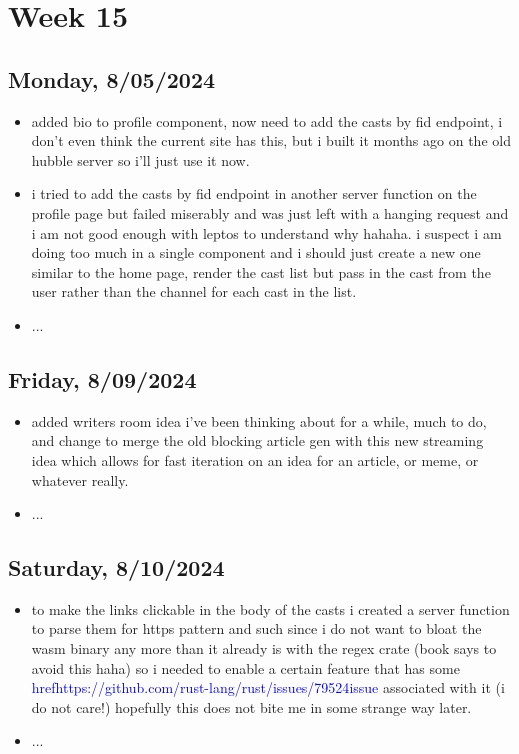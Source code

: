 \newpage
\section{Week 15}

\subsection*{Monday, 8/05/2024}
\begin{itemize}
    \item added bio to profile component, now need to add the casts by fid
        endpoint, i don't even think the current site has this, but i built it
        months ago on the old hubble server so i'll just use it now.
    \item i tried to add the casts by fid endpoint in another server function on
        the profile page but failed miserably and was just left with a hanging
        request and i am not good enough with leptos to understand why hahaha. i
        suspect i am doing too much in a single component and i should just
        create a new one similar to the home page, render the cast list but pass
        in the cast from the user rather than the channel for each cast in the
        list.
    \item ...
\end{itemize}

\subsection*{Friday, 8/09/2024}
\begin{itemize}
    \item added writers room idea i've been thinking about for a while, much to
        do, and change to merge the old blocking article gen with this new
        streaming idea which allows for fast iteration on an idea for an
        article, or meme, or whatever really.
    \item ...
\end{itemize}

\subsection*{Saturday, 8/10/2024}
\begin{itemize}
    \item to make the links clickable in the body of the casts i created a
        server function to parse them for https pattern and such since i do not
        want to bloat the wasm binary any more than it already is with the regex
        crate (book says to avoid this haha) so i needed to enable a certain
        feature that has some 
        \textcolor{blue}{href{https://github.com/rust-lang/rust/issues/79524}{issue}}
        associated with it (i do not care!)
        hopefully this does not bite me in some strange way later.
    \item ...
\end{itemize}
